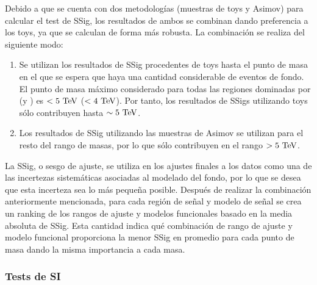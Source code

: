 Debido a que se cuenta con dos metodologías (muestras de toys y Asimov) para calcular el test de \ac{SSig}, los resultados de ambos se combinan dando preferencia a los toys, ya que se calculan de forma más robusta. La combinación se realiza del siguiente modo:
\begin{enumerate}
    \item Se utilizan los resultados de \ac{SSig} procedentes de toys hasta el punto de masa en el que se espera que haya una cantidad considerable de eventos de fondo. El punto de masa máximo considerado para todas las regiones dominadas por \ljets (\bjets y \cjets) es \(<5~\text{TeV}\) (\(<4~\text{TeV}\)). Por tanto, los resultados de \acp{SSig} utilizando toys sólo contribuyen hasta \(\sim 5~\text{TeV}\).
    \item Los resultados de \ac{SSig} utilizando las muestras de Asimov se utilizan para el resto del rango de masas, por lo que sólo contribuyen en el rango \(> 5~\text{TeV}\).
\end{enumerate}
La \ac{SSig}, o sesgo de ajuste, se utiliza en los ajustes finales a los datos como una de las incertezas sistemáticas asociadas al modelado del fondo, por lo que se desea que esta incerteza sea lo más pequeña posible. Después de realizar la combinación anteriormente mencionada, para cada región de señal y modelo de señal se crea un ranking de los rangos de ajuste y modelos funcionales basado en la media absoluta de \ac{SSig}. Esta cantidad indica qué combinación de rango de ajuste y modelo funcional proporciona la menor \ac{SSig} en promedio para cada punto de masa dando la misma importancia a cada masa.

































\subsubsection{Tests de \acl{SI}}
\label{subsubsec:bkg:modeling:sigbkg:sitest}

